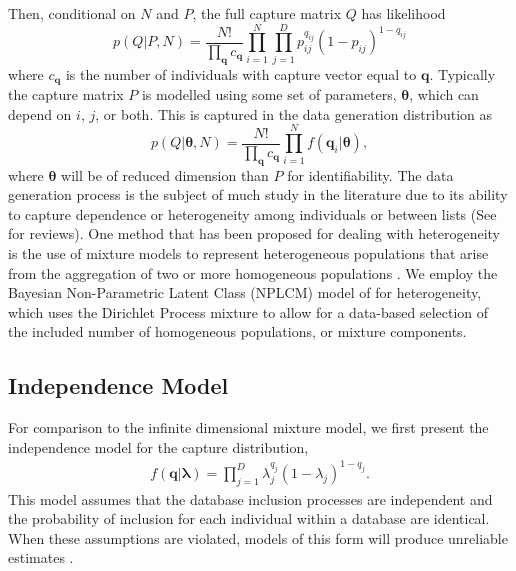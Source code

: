 \documentclass[11pt]{article}
\begin{document}
Then, conditional on $N$ and $P$, the full capture matrix $Q$ has likelihood
$$
p(Q | P, N) = \frac{N!}{\prod_{\boldsymbol q} c_{\boldsymbol q}} \prod\limits_{i = 1}^N\prod\limits_{j = 1}^D p_{ij}^{q_{ij}} (1-p_{ij})^{1-q_{ij}}
$$
where $c_{\boldsymbol q}$ is the number of individuals with capture vector equal to $\boldsymbol q$. Typically the capture matrix $P$ is modelled using some set of parameters, $\boldsymbol \theta$, which can depend on $i$, $j$, or both. This is captured in the data generation distribution as
$$
p(Q | \boldsymbol \theta, N) = \frac{N!}{\prod_{\boldsymbol q} c_{\boldsymbol q}} \prod\limits_{i = 1}^Nf(\boldsymbol q_i | \boldsymbol \theta),
$$
where $\boldsymbol \theta$ will be of reduced dimension than $P$ for identifiability. The data generation process is the subject of much study in the literature due to its ability to capture dependence or heterogeneity among individuals or between lists (See \cite{fienberg1999classical,king2001bayesian,king2008bayesian} for reviews). One method that has been proposed for dealing with heterogeneity is the use of mixture models to represent heterogeneous populations that arise from the aggregation of two or more homogeneous populations \citep{norris1996nonparametric,arnold2010capture}. We employ the Bayesian Non-Parametric Latent Class (NPLCM) model of \citep{manrique2016bayesian} for heterogeneity, which uses the Dirichlet Process mixture to allow for a data-based selection of the included number of homogeneous populations, or mixture components.

\subsection{Independence Model}

For comparison to the infinite dimensional mixture model, we first present the independence model for the capture distribution,
\begin{align}
f(\boldsymbol q | \boldsymbol \lambda) = \prod\limits_{j = 1}^D \lambda_j^{q_j}(1-\lambda_j)^{1-q_j}.
\label{crc:indep}
\end{align}
This model assumes that the database inclusion processes are independent and the probability of inclusion for each individual within a database are identical. When these assumptions are violated, models of this form will produce unreliable estimates \citep{fienberg1999classical}.
\end{document}
